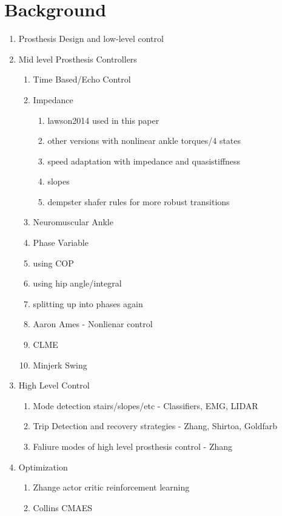 \chapter{Background}\label{sec:back}

\graphicspath{{chapters/background/figures/}}

\begin{enumerate}
\item Prosthesis Design and low-level control
\item Mid level Prosthesis Controllers
    \begin{enumerate}
        \item Time Based/Echo Control
        \item Impedance 
            \begin{enumerate}
                \item lawson2014 used in this paper
                \item other versions with nonlinear ankle torques/4 states
                \item speed adaptation with impedance and quasistiffness
                \item slopes
                \item dempster shafer rules for more robust transitions
            \end{enumerate}
        \item Neuromuscular Ankle
        \item Phase Variable
            \item using COP
            \item using hip angle/integral
            \item splitting up into phases again
        \item Aaron Ames - Nonlienar control 
        \item CLME
        \item Minjerk Swing
    \end{enumerate}
\item High Level Control
    \begin{enumerate}
        \item Mode detection stairs/slopes/etc - Classifiers, EMG, LIDAR
        \item Trip Detection and recovery strategies - Zhang, Shirtoa, Goldfarb
        \item Faliure modes of high level prosthesis control - Zhang
    \end{enumerate}
\item Optimization
    \begin{enumerate}
        \item Zhange actor critic reinforcement learning
        \item Collins CMAES
    \end{enumerate}
\end{enumerate}






